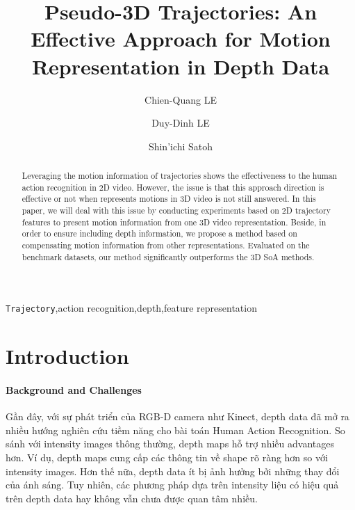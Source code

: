 \documentclass[review]{elsarticle}
\begin{document}
\begin{frontmatter}

\title{Pseudo-3D Trajectories: An Effective Approach for Motion Representation in Depth Data}

\author{Chien-Quang LE}
\address{The Graduate University for Advanced Studies}

\author{Duy-Dinh LE}
\address{National Institute of Informatics, The Graduate University for Advanced Studies}

\author{Shin'ichi Satoh}
\address{National Institute of Informatics, The University of Tokyo}


\begin{abstract}
Leveraging the motion information of trajectories shows the effectiveness to the human action recognition in 2D video. However, the issue is that this approach direction is effective or not when represents motions in 3D video is not still answered. In this paper, we will deal with this issue by conducting experiments based on 2D trajectory features to present motion information from one 3D video representation. Beside, in order to ensure including depth information, we propose a method based on compensating motion information from other representations. Evaluated on the benchmark datasets, our method significantly outperforms the 3D SoA methods.
\end{abstract}

\begin{keyword}
\texttt{Trajectory}\sep action recognition\sep depth\sep feature representation
\end{keyword}

\end{frontmatter}

\linenumbers

\section{Introduction}

\paragraph{Background and Challenges} Gần đây, với sự phát triển của RGB-D camera như Kinect, depth data đã mở ra nhiều hướng nghiên cứu tiềm năng cho bài toán Human Action Recognition. So sánh với intensity images thông thường, depth maps hỗ trợ nhiều advantages hơn. Ví dụ, depth maps cung cấp các thông tin về shape rõ ràng hơn so với intensity images. Hơn thế nữa, depth data ít bị ảnh hưởng bởi những thay đổi của ánh sáng. Tuy nhiên, các phương pháp dựa trên intensity liệu có hiệu quả trên depth data hay không vẫn chưa được quan tâm nhiều.
\end{document}
